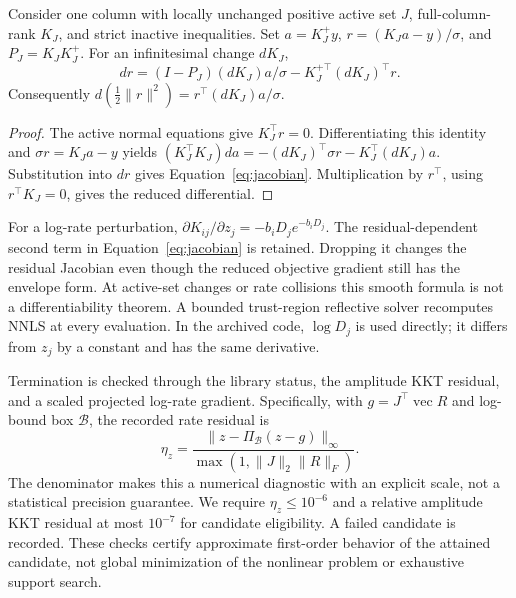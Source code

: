 \begin{Proposition}\label{prop:derivative}
Consider one column with locally unchanged positive active set $J$, full-column-rank $K_J$, and strict inactive inequalities. Set $a=K_J^+y$, $r=(K_Ja-y)/\sigma$, and $P_J=K_JK_J^+$. For an infinitesimal change $dK_J$,
\begin{equation}\label{eq:jacobian}
 dr=(I-P_J)(dK_J)a/\sigma-K_J^{+\top}(dK_J)^\top r.
\end{equation}
Consequently $d(\tfrac12\|r\|^2)=r^\top(dK_J)a/\sigma$.
\end{Proposition}
\begin{proof}
The active normal equations give $K_J^\top r=0$. Differentiating this identity and $\sigma r=K_Ja-y$ yields
$(K_J^\top K_J)da=-(dK_J)^\top\sigma r-K_J^\top(dK_J)a$.
Substitution into $dr$ gives Equation~\eqref{eq:jacobian}. Multiplication by $r^\top$, using $r^\top K_J=0$, gives the reduced differential.
\end{proof}

For a log-rate perturbation, $\partial K_{ij}/\partial z_j=-b_iD_j e^{-b_iD_j}$. The residual-dependent second term in Equation~\eqref{eq:jacobian} is retained. Dropping it changes the residual Jacobian even though the reduced objective gradient still has the envelope form. At active-set changes or rate collisions this smooth formula is not a differentiability theorem. A bounded trust-region reflective solver recomputes NNLS at every evaluation. In the archived code, $\log D_j$ is used directly; it differs from $z_j$ by a constant and has the same derivative.

Termination is checked through the library status, the amplitude KKT residual, and a scaled projected log-rate gradient. Specifically, with $g=J^\top\operatorname{vec}R$ and log-bound box $\mathcal B$, the recorded rate residual is
\begin{equation}\label{eq:stationarity}
 \eta_z=\frac{\|z-\Pi_{\mathcal B}(z-g)\|_\infty}
 {\max(1,\|J\|_2\|R\|_F)}.
\end{equation}
The denominator makes this a numerical diagnostic with an explicit scale, not a statistical precision guarantee. We require $\eta_z\leq10^{-6}$ and a relative amplitude KKT residual at most $10^{-7}$ for candidate eligibility. A failed candidate is recorded. These checks certify approximate first-order behavior of the attained candidate, not global minimization of the nonlinear problem or exhaustive support search.

